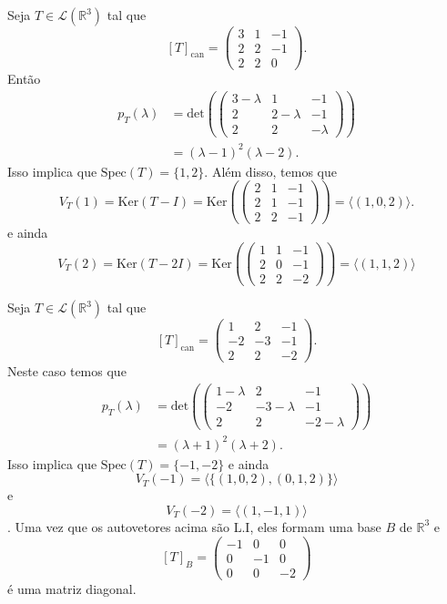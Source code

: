 \documentclass[11pt,twoside,a4paper]{book}
\begin{document}
\begin{exemplo}
Seja \(T\in\mathcal{L}(\mathbb{R}^3)\) tal que\[[T]_{\text{can}}=\begin{pmatrix}
3 & 1 & -1\\2 & 2 & -1\\ 2 & 2 & 0
\end{pmatrix}.\]
Então \begin{align*}
p_T(\lambda)&=\text{det}\left(\begin{pmatrix}
3-\lambda & 1 & -1\\2 & 2-\lambda & -1\\ 2 & 2 & -\lambda
\end{pmatrix}\right)\\&=(\lambda-1)^2(\lambda-2).
\end{align*}
Isso implica que \(\text{Spec}(T)=\{1,2\}\). Além disso, temos que
\[V_T(1)=\text{Ker}(T-I)=\text{Ker}(\begin{pmatrix}
2 & 1 & -1\\2 & 1 & -1\\ 2 & 2 & -1
\end{pmatrix})=\langle (1,0,2)\rangle.\]
e ainda
\[V_T(2)=\text{Ker}(T-2 I)=\text{Ker}(\begin{pmatrix}
1 & 1 & -1\\2 & 0 & -1\\ 2 & 2 & -2
\end{pmatrix})=\langle (1,1,2)\rangle\]
\end{exemplo}
\begin{exemplo}
Seja \(T\in\mathcal{L}(\mathbb{R}^3)\) tal que
\[[T]_{\text{can}}=\begin{pmatrix}
1 & 2 & -1\\-2 & -3 & -1\\ 2 & 2 & -2
\end{pmatrix}.\]
Neste caso temos que \begin{align*}
p_T(\lambda)&=\text{det}(\begin{pmatrix}
1- \lambda & 2 & -1\\-2 & -3 - \lambda & -1\\ 2 & 2 & -2-\lambda
\end{pmatrix})\\&=(\lambda+1)^2(\lambda+2).    \end{align*}
Isso implica que \(\text{Spec}(T)=\{-1,-2\}\) e ainda \[V_T(-1)=\langle\{ (1,0,2),(0,1,2)\}\rangle\] e
\[V_T(-2)=\langle (1,-1,1)\rangle\].
Uma vez que os autovetores acima são L.I, eles formam uma base \(B\) de \(\mathbb{R}^3\) e 
\[[T]_B=\begin{pmatrix}
-1 & 0 & 0\\0 & -1 & 0\\ 0 & 0 & -2
\end{pmatrix}\]
é uma matriz diagonal.
\end{exemplo}
\end{document}

